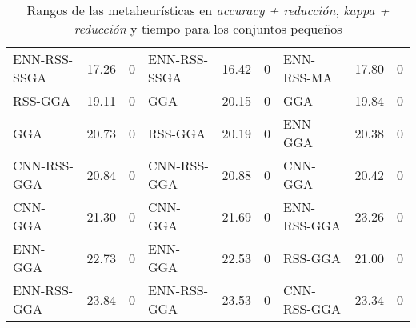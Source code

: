 \begin{table}[h!]
\begin{adjustbox}{max width =\textwidth}
\begin{tabular}{l c c|l c c|l c c}
ENN-RSS-SSGA & 17.26 & 0 & ENN-RSS-SSGA & 16.42 & 0  & ENN-RSS-MA   & 17.80 & 0 \\
RSS-GGA      & 19.11 & 0 & GGA          & 20.15 & 0  & GGA          & 19.84 & 0 \\
GGA          & 20.73 & 0 & RSS-GGA      & 20.19 & 0  & ENN-GGA      & 20.38 & 0 \\
CNN-RSS-GGA  & 20.84 & 0 & CNN-RSS-GGA  & 20.88 & 0  & CNN-GGA      & 20.42 & 0 \\
CNN-GGA      & 21.30 & 0 & CNN-GGA      & 21.69 & 0  & ENN-RSS-GGA  & 23.26 & 0 \\
ENN-GGA      & 22.73 & 0 & ENN-GGA      & 22.53 & 0  & RSS-GGA      & 21.00 & 0 \\
ENN-RSS-GGA  & 23.84 & 0 & ENN-RSS-GGA  & 23.53 & 0  & CNN-RSS-GGA  & 23.34 & 0 \\



\hline
\end{tabular}
\end{adjustbox}
\caption{Rangos de las metaheurísticas en \emph{accuracy + reducción}, \emph{kappa + reducción} y tiempo para los conjuntos pequeños}
\label{rank-peq}
\end{table} 

